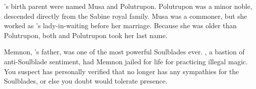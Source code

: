 \documentclass[char]{Kos}
\begin{document}
\begin{itemz}[Notes]
  \item \cWard{}'s birth parent were named Musa and Polutrupon. Polutrupon was a minor noble, descended directly from the Sabine royal family. Musa was a commoner, but she worked as \cScythiaQueen{}'s lady-in-waiting before her marriage. Because she was older than Polutrupon, both \cWard{} and Polutrupon took her last name.
  \item Memnon, \cButler{}'s father, was one of the most powerful Soulblades ever. \cScythiaQueen{}, a bastion of anti-Soulblade sentiment, had Memnon jailed for life for practicing illegal magic. You suspect\cScythiaQueen{} has personally verified that \cButler{} no longer has any sympathies for the Soulblades, or else you doubt \cScythiaQueen{\they} would tolerate \cButler{\their} presence.
\end{itemz}
\end{document}
